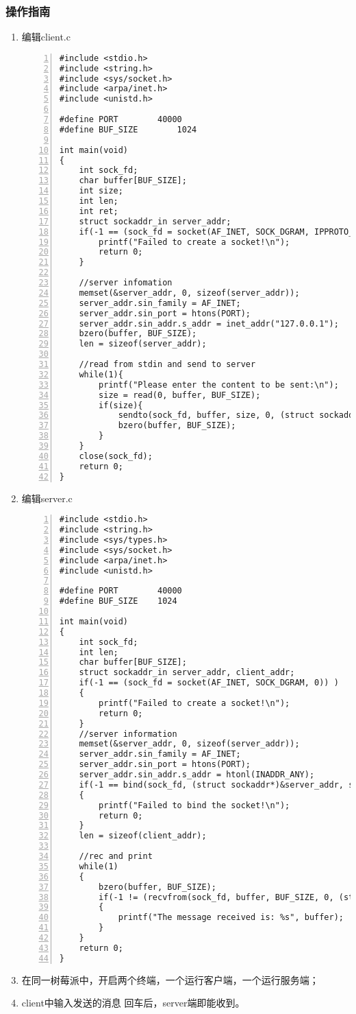 \documentclass{article}
\begin{document}
\subsubsection{操作指南}
\begin{enumerate}

	\item 编辑client.c
	      \begin{lstlisting}[numbers=left]
#include <stdio.h>
#include <string.h>
#include <sys/socket.h>
#include <arpa/inet.h>
#include <unistd.h>

#define PORT		40000
#define BUF_SIZE        1024

int main(void)
{
	int sock_fd;
	char buffer[BUF_SIZE];
	int size;
	int len;
	int ret;
	struct sockaddr_in server_addr;
	if(-1 == (sock_fd = socket(AF_INET, SOCK_DGRAM, IPPROTO_IP)) ){
		printf("Failed to create a socket!\n");
		return 0;
	}

	//server infomation
	memset(&server_addr, 0, sizeof(server_addr));
	server_addr.sin_family = AF_INET;
	server_addr.sin_port = htons(PORT);
	server_addr.sin_addr.s_addr = inet_addr("127.0.0.1");
	bzero(buffer, BUF_SIZE);
	len = sizeof(server_addr);

	//read from stdin and send to server
	while(1){
		printf("Please enter the content to be sent:\n");
		size = read(0, buffer, BUF_SIZE);
		if(size){
			sendto(sock_fd, buffer, size, 0, (struct sockaddr*)&server_addr, len);
			bzero(buffer, BUF_SIZE);
		}
	}
	close(sock_fd);
	return 0;
}

\end{lstlisting}
	\item 编辑server.c
	      \begin{lstlisting}[numbers=left]
#include <stdio.h>
#include <string.h>
#include <sys/types.h>
#include <sys/socket.h>
#include <arpa/inet.h>
#include <unistd.h>

#define	PORT		40000
#define	BUF_SIZE	1024

int main(void)
{
	int sock_fd;
	int len;
	char buffer[BUF_SIZE];
	struct sockaddr_in server_addr, client_addr;
	if(-1 == (sock_fd = socket(AF_INET, SOCK_DGRAM, 0)) )
	{
		printf("Failed to create a socket!\n");
		return 0;
	}
	//server information
	memset(&server_addr, 0, sizeof(server_addr));
	server_addr.sin_family = AF_INET;
	server_addr.sin_port = htons(PORT);
	server_addr.sin_addr.s_addr = htonl(INADDR_ANY);
	if(-1 == bind(sock_fd, (struct sockaddr*)&server_addr, sizeof(server_addr)))
	{
		printf("Failed to bind the socket!\n");
		return 0;
	}
	len = sizeof(client_addr);
	
	//rec and print
	while(1)
	{
		bzero(buffer, BUF_SIZE);
		if(-1 != (recvfrom(sock_fd, buffer, BUF_SIZE, 0, (struct sockaddr*)&client_addr, &len)) )
		{
			printf("The message received is: %s", buffer);
		}
	}
	return 0;
}

\end{lstlisting}
	\item 在同一树莓派中，开启两个终端，一个运行客户端，一个运行服务端；
	\item client中输入发送的消息 回车后，server端即能收到。
\end{enumerate}
\end{document}
